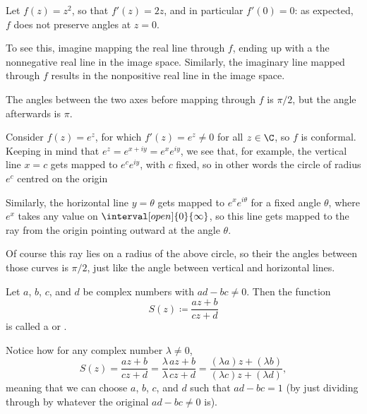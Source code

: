\begin{example}
	Let $f(z) = z^2$, so that $f'(z) = 2 z$, and in particular $f'(0) = 0$: as expected, $f$ does not preserve angles at $z = 0$.

	To see this, imagine mapping the real line through $f$, ending up with a the nonnegative real line in the image space.
	Similarly, the imaginary line mapped through $f$ results in the nonpositive real line in the image space.

	The angles between the two axes before mapping through $f$ is $\pi/2$, but the angle afterwards is $\pi$.
\end{example}

\begin{example}
	Consider $f(z) = e^z$, for which $f'(z) = e^z \neq 0$ for all $z \in \C$, so $f$ is conformal.
	Keeping in mind that $e^z = e^{x + i y} = e^x e^{i y}$,
	we see that, for example, the vertical line $x = c$ gets mapped to $e^c e^{i y}$, with $c$ fixed, so in other words the circle of radius $e^c$ centred on the origin

	Similarly, the horizontal line $y = \theta$ gets mapped to $e^x e^{i \theta}$ for a fixed angle $\theta$, where $e^x$ takes any value on $\interval[open]{0}{\infty}$, so this line gets mapped to the ray from the origin pointing outward at the angle $\theta$.

	Of course this ray lies on a radius of the above circle, so their the angles between those curves is $\pi/2$, just like the angle between vertical and horizontal lines.
\end{example}


\begin{definition}
	Let $a$, $b$, $c$, and $d$ be complex numbers with $a d - b c \neq 0$.
	Then the function
	\[
		S(z) \coloneqq \frac{a z + b}{c z + d}
	\]
	is called a  or .
\end{definition}

Notice how for any complex number $\lambda \neq 0$,
\[
	S(z) = \frac{a z + b}{c z + d} = \frac{\lambda}{\lambda} \frac{a z + b}{c z + d} = \frac{(\lambda a) z + (\lambda b)}{(\lambda c) z + (\lambda d)},
\]
meaning that we can choose $a$, $b$, $c$, and $d$ such that $a d - b c = 1$ (by just dividing through by whatever the original $a d - b c \neq 0$ is).

